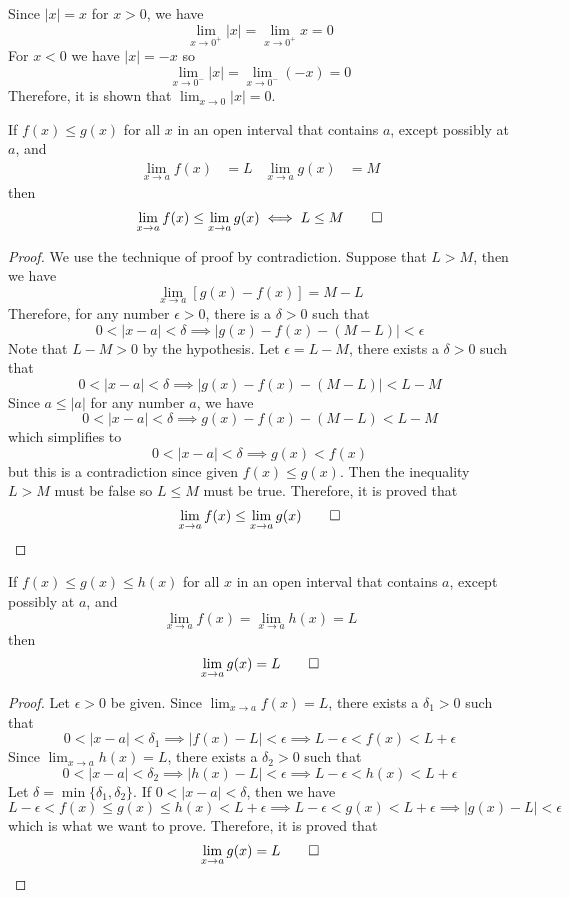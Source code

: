 \begin{solution}
    Since \(|x|=x\) for \(x>0\), we have
    \[\lim_{x\to 0^+}|x|=\lim_{x\to 0^+}x=0\]
    For \(x<0\) we have \(|x|=-x\) so
    \[\lim_{x\to 0^-}|x|=\lim_{x\to 0^-}(-x)=0\]
    Therefore, it is shown that \(\lim_{x\to 0}|x|=0\).
\end{solution}
\begin{theorem}
    If \(f(x)\leq g(x)\) for all \(x\) in an open interval that contains
    \(a\), except possibly at \(a\), and
    \begin{align*}
        \lim_{x\to a}f(x) &= L & \lim_{x\to a}g(x) &= M
    \end{align*}
    then
    \[\lim_{x\to a}f(x)\leq\lim_{x\to a}g(x)\iff L\leq M\qedhere\]
\end{theorem}
\begin{proof}
    We use the technique of proof by contradiction.
    Suppose  that \(L>M\), then we have
    \[\lim_{x\to a}[g(x)-f(x)]=M-L\]
    Therefore, for any number \(\epsilon>0\),
    there is a \(\delta>0\) such that
    \[0<|x-a|<\delta\implies|g(x)-f(x)-(M-L)|<\epsilon\]
    Note that \(L-M>0\) by the hypothesis.
    Let \(\epsilon=L-M\), there exists a \(\delta>0\) such that
    \[0<|x-a|<\delta\implies|g(x)-f(x)-(M-L)|<L-M\]
    Since \(a\leq|a|\) for any number \(a\), we have
    \[0<|x-a|<\delta\implies g(x)-f(x)-(M-L)<L-M\]
    which simplifies to
    \[0<|x-a|<\delta\implies g(x)<f(x)\]
    but this is a contradiction since given \(f(x)\leq g(x)\).
    Then the inequality \(L>M\) must be false so \(L\leq M\) must be true.
    Therefore, it is proved that
    \[\lim_{x\to a}f(x)\leq\lim_{x\to a}g(x)\qedhere\]
\end{proof}
\begin{theorem}
    If \(f(x)\leq g(x)\leq h(x)\) for all \(x\) in an open interval that
    contains \(a\), except possibly at \(a\), and
    \[\lim_{x\to a}f(x)=\lim_{x\to a}h(x)=L\]
    then
    \[\lim_{x\to a}g(x)=L\qedhere\]
\end{theorem}
\begin{proof}
    Let \(\epsilon>0\) be given. Since \(\lim_{x\to a}f(x)=L\), there exists a
    \(\delta_1>0\) such that
    \[0<|x-a|<\delta_1\implies|f(x)-L|<\epsilon\implies L-\epsilon<f(x)
    <L+\epsilon\]
    Since \(\lim_{x\to a}h(x)=L\), there exists a \(\delta_2>0\) such that
    \[0<|x-a|<\delta_2\implies|h(x)-L|<\epsilon\implies L-\epsilon<h(x)
    <L+\epsilon\]
    Let \(\delta=\min\{\delta_1,\delta_2\}\).
    If \(0<|x-a|<\delta\), then we have
    \[L-\epsilon<f(x)\leq g(x)\leq h(x)<L+\epsilon\implies L-\epsilon<g(x)
    <L+\epsilon\implies|g(x)-L|<\epsilon\]
    which is what we want to prove.
    Therefore, it is proved that \[\lim_{x\to a}g(x)=L\qedhere\]
\end{proof}
